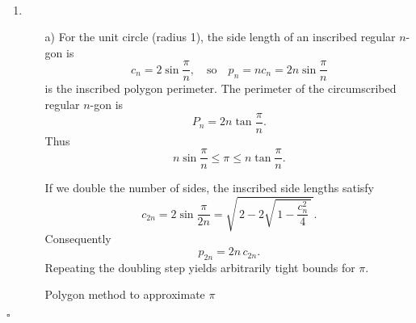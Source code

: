 \documentclass[11pt,a4paper]{article}
\theoremstyle{definition}
\newenvironment{solution}{\par\noindent{\it Solution.} }{\hfill $\square$ \par}
\begin{document}
\begin{solution}\\

\begin{enumerate}
  \item 
  \begin{itemize}
  \item[a)] For the unit circle (radius 1), the side length of an inscribed regular $n$-gon is
\[
c_n = 2\sin\frac{\pi}{n},\quad\text{so}\quad p_n = n c_n = 2n\sin\frac{\pi}{n}
\]
is the inscribed polygon perimeter. The perimeter of the circumscribed regular $n$-gon is
\[
P_n = 2n\tan\frac{\pi}{n}.
\]
Thus
\[
n\sin\frac{\pi}{n}\le \pi \le n\tan\frac{\pi}{n}.
\]

If we double the number of sides, the inscribed side lengths satisfy
\[
c_{2n}=2\sin\frac{\pi}{2n}= \sqrt{\,2-2\sqrt{\,1-\dfrac{c_n^2}{4}\,}\, }.
\]
Consequently
\[
p_{2n}=2n\,c_{2n}.
\]
Repeating the doubling step yields arbitrarily tight bounds for $\pi$.\\

\begin{algorithm}[H]
\BlankLine
{}
\caption{Polygon method to approximate $\pi$}
\end{algorithm}


\end{itemize}
\end{enumerate}
\end{solution}
\end{document}
